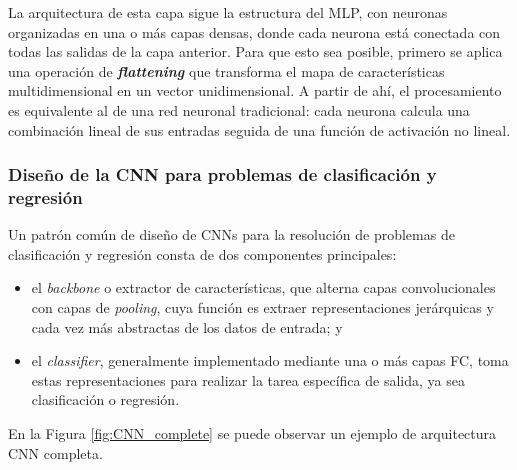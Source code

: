 La arquitectura de esta capa sigue la estructura del MLP, con neuronas organizadas en una o más capas densas, 
donde cada neurona está conectada con todas las salidas de la capa anterior. Para que esto sea posible, 
primero se aplica una operación de \textbf{\textit{flattening}} que transforma el mapa de características 
multidimensional en un vector unidimensional. A partir de ahí, el procesamiento es equivalente al de una red 
neuronal tradicional: cada neurona calcula una combinación lineal de sus entradas seguida de una función de 
activación no lineal.


\subsubsection{Diseño de la CNN para problemas de clasificación y regresión}

Un patrón común de diseño de CNNs para la resolución de problemas de clasificación y regresión consta de dos
componentes principales:

\begin{itemize}

    \item el \textit{backbone} o extractor de características, que alterna capas convolucionales con capas de
    \textit{pooling}, cuya función es extraer representaciones jerárquicas y cada vez más abstractas de los 
    datos de entrada; y

    \item el \textit{classifier}, generalmente implementado mediante una o más capas FC, 
    toma estas representaciones para realizar la tarea específica de salida, ya sea clasificación o regresión.

\end{itemize}

En la Figura \ref{fig:CNN_complete} se puede observar un ejemplo de arquitectura CNN completa. 


